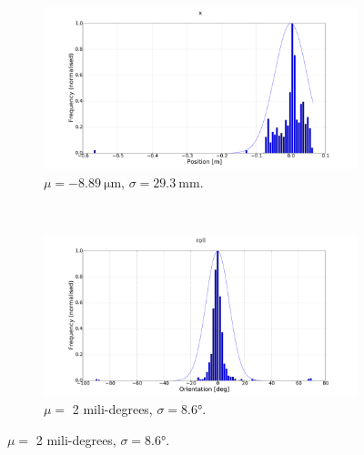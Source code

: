 \begin{figure}
  \begin{subfigure}{0.48\textwidth}
    \includegraphics[clip, trim = 120 0 120 0, width=\textwidth]{figures/chapter3/norm_x}
    \caption{$\mu = \SI{-8.89}{\micro \m}$, $\sigma = \SI{29.3}{\mm}$.}
  \end{subfigure}
~
  \begin{subfigure}{0.48\textwidth}
     \includegraphics[clip, trim = 120 0 120 0, width=\textwidth]{figures/chapter3/norm_roll.pdf}
     \caption{$\mu = $ 2 mili-degrees, $\sigma = \ang{8.6}$.}
  \label{fig:norm-roll}
  \end{subfigure}


\end{figure}
